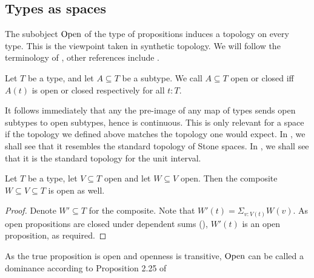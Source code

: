 \subsection{Types as spaces}
The subobject $\mathrm{Open}$ of the type of propositions induces a topology on every type. 
This is the viewpoint taken in synthetic topology. 
We will follow the terminology of \cite{SyntheticTopologyLesnik}, 
other references include \cite{SyntheticTopologyEscardo, TODOSortOutTaylorsReferences}.

\begin{definition}
  Let $T$ be a type, and let $A\subseteq T$ be a subtype. 
  We call $A\subseteq T$ open or closed iff $A(t)$ is open or closed respectively for all $t:T$.
\end{definition}

\begin{remark}
  It follows immediately that any the pre-image of any map of types sends 
  open subtypes to open subtypes, hence is continuous. 
  This is only relevant for a space if the topology we defined above matches the topology one would expect. 
  In , we shall see that it resembles the standard topology of Stone spaces.
  In , we shall see that it is the standard topology for the unit interval. 
\end{remark}

\begin{lemma}
  Let $T$ be a type, let $V\subseteq T$ open and let $W\subseteq V$ open. 
  Then the composite $W\subseteq V\subseteq T$ is open as well. 
\end{lemma}
\begin{proof}
  Denote $W'\subseteq T$ for the composite. 
  Note that $W'(t) = \Sigma_{v:V(t)} W(v)$. 
  As open propositions are closed under dependent sums (), 
  $W'(t)$ is an open proposition, as required. 
\end{proof}

\begin{remark}
  As the true proposition is open and openness is transitive, 
  $\mathrm{Open}$ can be called a dominance according to Proposition 2.25 of \cite{SyntheticTopologyLesnik}
\end{remark}




